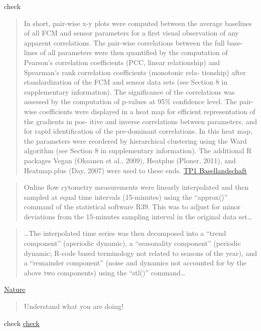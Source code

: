 \documentclass[9pt,ignorenonframetext,]{beamer}
\begin{document}
\begin{frame}{check}

\begin{quote}
In short, pair-wise x-y plots were computed between the average
baselines of all FCM and sensor parameters for a first visual
observation of any apparent correlations. The pair-wise correlations
between the full base- lines of all parameters were then quantified by
the computation of Pearson's correlation coefficients (PCC, linear
relationship) and Spearman's rank correlation coefficients (monotonic
rela- tionship) after standardization of the FCM and sensor data sets
(see Section 8 in supplementary information). The significance of the
correlations was assessed by the computation of p-values at 95\%
confidence level. The pair-wise coefficients were displayed in a heat
map for efficient representation of the gradients in pos- itive and
inverse correlations between parameters, and for rapid identification of
the pre-dominant correlations. In this heat map, the parameters were
reordered by hierarchical clustering using the Ward algorithm (see
Section 8 in supplementary information). The additional R packages Vegan
(Oksanen et al., 2009), Heatplus (Ploner, 2011), and Heatmap.plus (Day,
2007) were used to these ends.
\href{https://www.baselland.ch/politik-und-behorden/direktionen/bau-und-umweltschutzdirektion/umweltschutz-energie/wasser/wasserversorgung/publikationen/downloads/tp1-karstsysteme.pdf}{TP1
Basellandschaft}
\end{quote}

\begin{quote}
Online flow cytometry measurements were linearly interpolated and then
sampled at equal time intervals (15-minutes) using the ``approx()''
command of the statistical software R39. This was to adjust for minor
deviations from the 15-minutes sampling interval in the original data
set\ldots{}
\end{quote}

\begin{quote}
\ldots{}The interpolated time series was then decomposed into a ``trend
component'' (aperiodic dynamic), a ``seasonality component'' (periodic
dynamic; R-code based terminology not related to seasons of the year),
and a ``remainder component'' (noise and dynamics not accounted for by
the above two components) using the ``stl()'' command\ldots{}
\end{quote}

\href{https://www.nature.com/articles/srep38462}{Nature}

\begin{quote}
Understand what you are doing!
\end{quote}

check
\href{http://uribo.github.io/rpkg_showcase/date_and_time/zoo.html}{check}

\end{frame}
\end{document}
